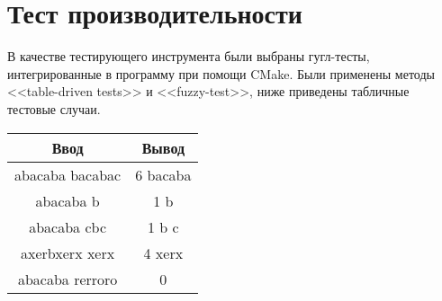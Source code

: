 \section{Тест производительности}

В качестве тестирующего инструмента были выбраны гугл-тесты, интегрированные в программу при помощи CMake. Были применены методы <<table-driven tests>> и <<fuzzy-test>>, ниже приведены табличные тестовые случаи.

\begin{center}
	
	\begin{tabular}{| c | c |}
		\hline
		Ввод & Вывод \\
		\hline
		abacaba bacabac & 6 bacaba \\
		\hline
		abacaba b & 1 b \\
		\hline
		abacaba cbc & 1 b c \\
		\hline
		axerbxerx xerx & 4 xerx \\
		\hline
		abacaba rerroro & 0 \\
		\hline
	\end{tabular}

\end{center}

\pagebreak

